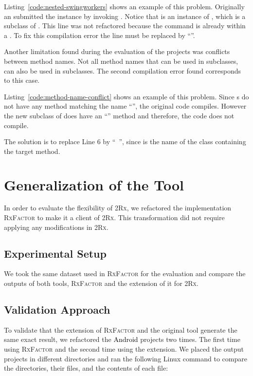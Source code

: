 \documentclass[type=bsc,accentcolor=tud9c]{tudthesis}
\newcommand{\framework}[1]{\textcolor{black}{#1}}
\newcommand{\toolcore}{\textsc{2Rx}}
\begin{document}
Listing~\ref{code:nested-swingworkers} shows an example of this problem. Originally an  submitted the instance  by invoking . Notice that  is an instance of , which is a subclass of . This line was not refactored because the command is already within a . To fix this compilation error the line must be replaced by ``''.



Another limitation found during the evaluation of the projects was conflicts between method names. Not all method names that can be used in  subclasses, can also be used in  subclasses. The second compilation error found corresponds to this case. 

Listing~\ref{code:method-name-conflict} shows an example of this problem. Since s do not have any method matching the name ``'', the original code compiles. However the new subclass of  does have an ``'' method and therefore, the code does not compile. 

The solution is to replace Line 6 by ``~'', since  is the name of the class containing the target method.



\section{Generalization of the Tool}
In order to evaluate the flexibility of \toolcore{}, we refactored the implementation \textsc{RxFactor} to make it a client of \toolcore{}. This transformation did not require applying any modifications in \toolcore{}.

\subsection{Experimental Setup}
We took the same dataset used in \textsc{RxFactor} for the evaluation and compare the outputs of both tools, \textsc{RxFactor} and the extension of it for \toolcore{}.

\subsection{Validation Approach}
To validate that the extension of \textsc{RxFactor} and the original tool generate the same exact result, we refactored the \framework{Android} projects two times. The first time using \textsc{RxFactor} and the second time using the extension. We placed the output projects in different directories and ran the following Linux command to compare the directories, their files, and the contents of each file:
\end{document}
